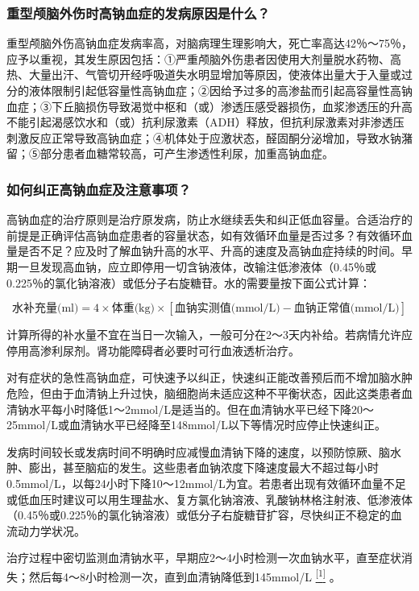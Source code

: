 \subsubsection{重型颅脑外伤时高钠血症的发病原因是什么？}

重型颅脑外伤高钠血症发病率高，对脑病理生理影响大，死亡率高达42％～75％，应予以重视，其发生原因包括：①严重颅脑外伤患者因使用大剂量脱水药物、高热、大量出汗、气管切开经呼吸道失水明显增加等原因，使液体出量大于入量或过分的液体限制引起低容量性高钠血症；②因给予过多的高渗盐而引起高容量性高钠血症；③下丘脑损伤导致渴觉中枢和（或）渗透压感受器损伤，血浆渗透压的升高不能引起渴感饮水和（或）抗利尿激素（ADH）释放，但抗利尿激素对非渗透压刺激反应正常导致高钠血症；④机体处于应激状态，醛固酮分泌增加，导致水钠潴留；⑤部分患者血糖常较高，可产生渗透性利尿，加重高钠血症。

\subsubsection{如何纠正高钠血症及注意事项？}

高钠血症的治疗原则是治疗原发病，防止水继续丢失和纠正低血容量。合适治疗的前提是正确评估高钠血症患者的容量状态，如有效循环血量是否过多？有效循环血量是否不足？应及时了解血钠升高的水平、升高的速度及高钠血症持续的时间。早期一旦发现高血钠，应立即停用一切含钠液体，改输注低渗液体（0.45％或0.225％的氯化钠溶液）或低分子右旋糖苷。水的需要量按下面公式计算：

\[
\text{水补充量(ml)}=4\times \text{体重(kg)}\times[\text{血钠实测值(mmol/L)}-\text{血钠正常值(mmol/L)}]    
\]

计算所得的补水量不宜在当日一次输入，一般可分在2～3天内补给。若病情允许应停用高渗利尿剂。肾功能障碍者必要时可行血液透析治疗。

对有症状的急性高钠血症，可快速予以纠正，快速纠正能改善预后而不增加脑水肿危险，但由于血清钠上升过快，脑细胞尚未适应这种不平衡状态，因此这类患者血清钠水平每小时降低1～2mmol/L是适当的。但在血清钠水平已经下降20～25mmol/L或血清钠水平已经降至148mmol/L以下等情况时应停止快速纠正。

发病时间较长或发病时间不明确时应减慢血清钠下降的速度，以预防惊厥、脑水肿、膨出，甚至脑疝的发生。这些患者血钠浓度下降速度最大不超过每小时0.5mmol/L，以每24小时下降10～12mmol/L为宜。若患者出现有效循环血量不足或低血压时建议可以用生理盐水、复方氯化钠溶液、乳酸钠林格注射液、低渗液体（0.45％或0.225％的氯化钠溶液）或低分子右旋糖苷扩容，尽快纠正不稳定的血流动力学状况。

治疗过程中密切监测血清钠水平，早期应2～4小时检测一次血钠水平，直至症状消失；然后每4～8小时检测一次，直到血清钠降低到145mmol/L
\protect\hyperlink{text00025.htmlux5cux23ch1-24}{\textsuperscript{{[}1{]}}}
。

